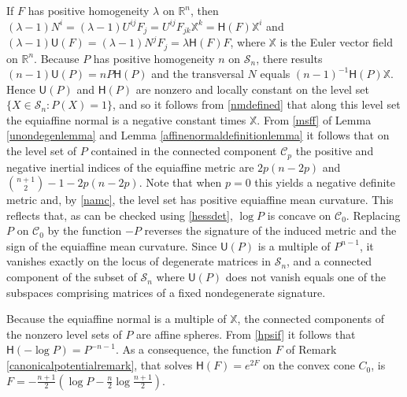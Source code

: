 \documentclass [leqno, 10pt]{amsart}
\theoremstyle{definition}
\numberwithin{equation}{section}
\newcommand{\C}{\mathscr{C}}
\newcommand{\sm}{\mathscr{S}}
\newcommand{\U}{\mathsf{U}}
\renewcommand{\H}{\mathsf{H}}
\newcommand{\la}{\lambda}
\newcommand{\eul}{\mathbb{X}}
\newcommand{\rea}{\mathbb R}
\begin{document}
\begin{example}
If $F$ has positive homogeneity $\la$ on $\rea^{n}$, then $(\la-1)N^{i} = (\la - 1)U^{ij}F_{j} = U^{ij}F_{jk}\eul^{k} = \H(F)\eul^{i}$ and $(\la -1)\U(F) = (\la - 1)N^{j}F_{j} = \la \H(F) F$, where $\eul$ is the Euler vector field on $\rea^{n}$. Because $P$ has positive homogeneity $n$ on $\sm_{n}$, there results $(n-1)\U(P) = nP\H(P)$ and the transversal $N$ equals $(n-1)^{-1}\H(P)\eul$. Hence $\U(P)$ and $\H(P)$ are nonzero and locally constant on the level set $\{X \in \sm_{n}: P(X) = 1\}$, and so it follows from \eqref{nmdefined} that along this level set the equiaffine normal is a negative constant times $\eul$. 
From \eqref{msff} of Lemma \ref{unondegenlemma} and Lemma \ref{affinenormaldefinitionlemma} it follows that on the level set of $P$ contained in the connected component $\C_{p}$ the positive and negative inertial indices of the equiaffine metric are $2p(n-2p)$ and $\binom{n+1}{2} -1 - 2p(n-2p)$. Note that when $p = 0$ this yields a negative definite metric and, by \eqref{namc}, the level set has positive equiaffine mean curvature. This reflects that, as can be checked using \eqref{hessdet}, $\log P$ is concave on $\C_{0}$. Replacing $P$ on $\C_{0}$ by the function $-P$ reverses the signature of the induced metric and the sign of the equiaffine mean curvature. Since $\U(P)$ is a multiple of $P^{n-1}$, it vanishes exactly on the locus of degenerate matrices in $\sm_{n}$, and a connected component of the subset of $\sm_{n}$ where $\U(P)$ does not vanish equals one of the subspaces comprising matrices of a fixed nondegenerate signature.

Because the equiaffine normal is a multiple of $\eul$, the connected components of the nonzero level sets of $P$ are affine spheres. From \eqref{hpsif} it follows that $\H(-\log P) = P^{-n-1}$. As a consequence, the function $F$ of Remark \ref{canonicalpotentialremark}, that solves $\H(F)  = e^{2F}$ on the convex cone $C_{0}$, is 
$F = -\tfrac{n+1}{2}\left(\log P - \tfrac{n}{2}\log\tfrac{n+1}{2}\right)$.
\end{example}
\end{document}
